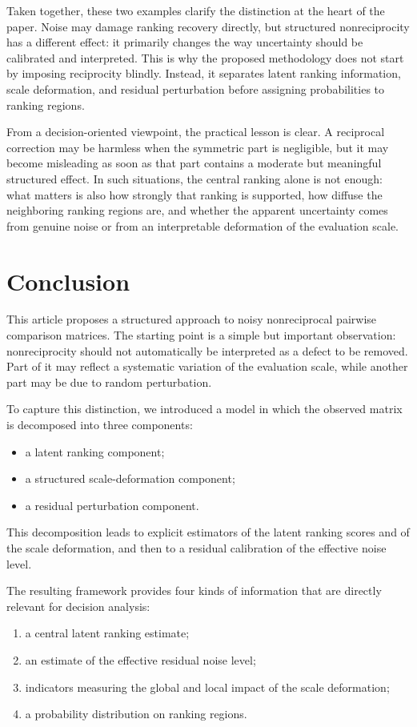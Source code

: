 \documentclass[11pt]{amsart}
\theoremstyle{definition}
\theoremstyle{plain}
\numberwithin{equation}{section}
\begin{document}
Taken together, these two examples clarify the distinction at the heart of the paper. Noise may damage ranking recovery directly, but structured nonreciprocity has a different effect: it primarily changes the way uncertainty should be calibrated and interpreted. This is why the proposed methodology does not start by imposing reciprocity blindly. Instead, it separates latent ranking information, scale deformation, and residual perturbation before assigning probabilities to ranking regions.

From a decision-oriented viewpoint, the practical lesson is clear. A reciprocal correction may be harmless when the symmetric part is negligible, but it may become misleading as soon as that part contains a moderate but meaningful structured effect. In such situations, the central ranking alone is not enough: what matters is also how strongly that ranking is supported, how diffuse the neighboring ranking regions are, and whether the apparent uncertainty comes from genuine noise or from an interpretable deformation of the evaluation scale.
\section{Conclusion}

This article proposes a structured approach to noisy nonreciprocal pairwise comparison matrices. The starting point is a simple but important observation: nonreciprocity should not automatically be interpreted as a defect to be removed. Part of it may reflect a systematic variation of the evaluation scale, while another part may be due to random perturbation.

To capture this distinction, we introduced a model in which the observed matrix is decomposed into three components:
\begin{itemize}
\item a latent ranking component;
\item a structured scale-deformation component;
\item a residual perturbation component.
\end{itemize}
This decomposition leads to explicit estimators of the latent ranking scores and of the scale deformation, and then to a residual calibration of the effective noise level.

The resulting framework provides four kinds of information that are directly relevant for decision analysis:
\begin{enumerate}[label=\textup{(\arabic*)}]
\item a central latent ranking estimate;
\item an estimate of the effective residual noise level;
\item indicators measuring the global and local impact of the scale deformation;
\item a probability distribution on ranking regions.
\end{enumerate}
\end{document}
